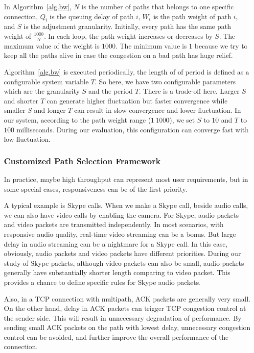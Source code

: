In Algorithm~\ref{alg.bw}, $N$ is the number of paths that belongs to one specific connection, $Q_i$ is the queuing delay of path $i$, $W_i$ is the path weight of path $i$, and $S$ is the adjustment granularity. Initially, every path has the same path weight of $\frac{1000}{N}$. In each loop, the path weight increases or decreases by $S$. The maximum value of the weight is $1000$. The minimum value is $1$ because we try to keep all the paths alive in case the congestion on a bad path has huge relief.

Algorithm~\ref{alg.bw} is executed periodically, the length of of period is defined as a configurable system variable $T$. So here, we have two configurable parameters which are the granularity $S$ and the period $T$. There is a trade-off here. Larger $S$ and shorter $T$ can generate higher fluctuation but faster convergence while smaller $S$ and longer $T$ can result in slow convergence and lower fluctuation. In our system, according to the path weight range ($1~1000$), we set $S$ to $10$ and $T$ to $100$ milliseconds. During our evaluation, this configuration can converge fast with low fluctuation.

\subsubsection{Customized Path Selection Framework}
\label{sec:resp}
In practice, maybe high throughput can represent most user requirements, but in some special cases, responsiveness can be of the first priority. 

A typical example is Skype\cite{skype} calls. When we make a Skype call, beside audio calls, we can also have video calls by enabling the camera. For Skype, audio packets and video packets are transmitted independently. In most scenarios, with responsive audio quality, real-time video streaming can be a bonus. But large delay in audio streaming can be a nightmare for a Skype call. In this case, obviously, audio packets and video packets have different priorities. During our study of Skype packets, although video packets can also be small, audio packets generally have substantially shorter length comparing to video packet. This provides a chance to define specific rules for Skype audio packets.

Also, in a TCP connection with multipath, ACK packets are generally very small. On the other hand, delay in ACK packets can trigger TCP congestion control at the sender side. This will result in unnecessary degradation of performance. By sending small ACK packets on the path with lowest delay, unnecessary congestion control can be avoided, and further improve the overall performance of the connection.

